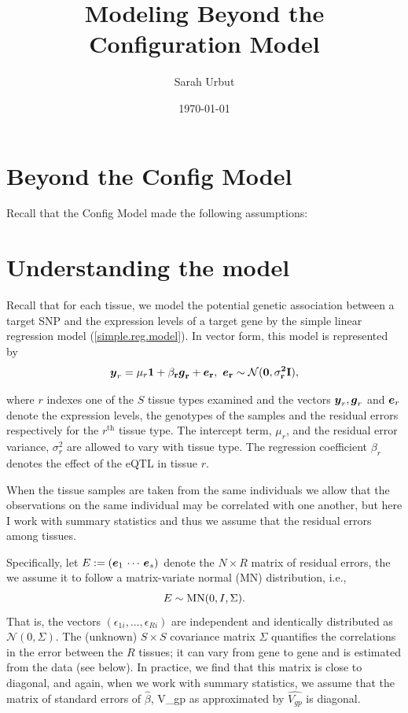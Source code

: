 \documentclass[10pt]{article}
\newcommand{\ev}{\mbox{\boldmath$e$}}
\newcommand{\gv}{\mbox{\boldmath$g$}}
\newcommand{\yv}{\mbox{\boldmath$y$}}
\newcommand{\lv}{\bf{1}}
\begin{document}
\title{Modeling Beyond the Configuration Model}
\author{Sarah Urbut}
\date{\today}

\maketitle

\tableofcontents

\vspace{1cm}

\section{Beyond the Config Model}

Recall that the Config Model made the following assumptions:

\section{Understanding the model}

Recall that for each tissue, we model the potential genetic association between a target SNP and the expression levels of a target gene by the simple linear regression model (\ref{simple.reg.model}). In vector form, this model is represented by
\begin{equation}
  \label{reg.model}
  \yv_r = \mu_r \lv + \beta_r \gv_r+ \ev_r,~\ev_r \sim \mathcal{N}(0,\sigma_r^2 I),
\end{equation}  

where $r$ indexes one of the $S$ tissue types examined and the vectors $\yv_r, \gv_r$ and $\ev_r$ denote the expression levels, the genotypes of the samples and the residual errors respectively for the $r^{\text{th}}$ tissue type.
The intercept term, $\mu_r$, and the residual error variance, $\sigma_r^2$ are allowed to vary with tissue type.
The regression coefficient $\beta_r$ denotes the effect of the eQTL in tissue $r$.

When the tissue samples are taken from the same individuals we allow that the observations on the same individual may be correlated with one another, but here I work with summary statistics and thus we assume that the residual errors among tissues.

Specifically, let $E := (\ev_1\,\cdots\,\ev_s)$  denote the $N \times R$ matrix of residual errors, the we assume it to follow a matrix-variate normal (MN) distribution, i.e.,
\begin{equation}
  E \sim {\rm MN}(0, I, \Sigma).
\end{equation}    
That is, the vectors $(\epsilon_{1i},\dots,\epsilon_{Ri})$ are independent and identically distributed as $\mathcal{N}(0, \Sigma)$.
The (unknown) $S \times S$ covariance matrix $\Sigma$ 
quantifies the correlations in the error between the $R$ tissues; it can vary from gene to gene and is estimated from the data (see below). In practice, we find that this matrix is close to diagonal, and again, when we work with summary statistics, we assume that the matrix of standard errors of $\hat\beta$, V_{gp} as approximated by $\hat{V_{gp}}$ is diagonal. 
\end{document}
